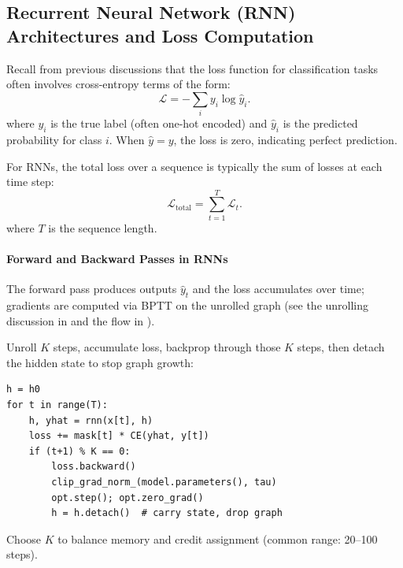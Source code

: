 \subsection{Recurrent Neural Network (RNN) Architectures and Loss Computation}
\label{sec:rnn_recurrent_neural_network_rnn_architectures_and_loss_computation}

Recall from previous discussions that the loss function for classification tasks often involves cross\hyp{}entropy terms of the form:
\[
\mathcal{L} = - \sum_{i} y_i \log \hat{y}_i.
\]
where \( y_i \) is the true label (often one-hot encoded) and \( \hat{y}_i \) is the predicted probability for class \( i \). When \( \hat{y} = y \), the loss is zero, indicating perfect prediction.

For RNNs, the total loss over a sequence is typically the sum of losses at each time step:
\[
\mathcal{L}_{\text{total}} = \sum_{t=1}^T \mathcal{L}_t.
\]
where \( T \) is the sequence length.

\paragraph{Forward and Backward Passes in RNNs}

The forward pass produces outputs \(\hat{y}_t\) and the loss accumulates over time; gradients are computed via BPTT on the unrolled graph (see the unrolling discussion in  and the flow in ).

\begin{tcolorbox}[summarybox, title={Truncated BPTT in practice}]
Unroll \(K\) steps, accumulate loss, backprop through those \(K\) steps, then detach the hidden state to stop graph growth:
\begin{verbatim}
h = h0
for t in range(T):
    h, yhat = rnn(x[t], h)
    loss += mask[t] * CE(yhat, y[t])
    if (t+1) % K == 0:
        loss.backward()
        clip_grad_norm_(model.parameters(), tau)
        opt.step(); opt.zero_grad()
        h = h.detach()  # carry state, drop graph
\end{verbatim}
Choose \(K\) to balance memory and credit assignment (common range: 20--100 steps).
\end{tcolorbox}

